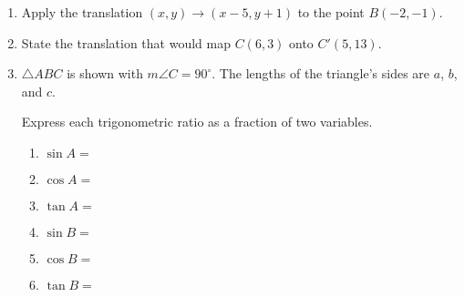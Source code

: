 \begin{enumerate}
\item Apply the translation $(x,y) \rightarrow (x-5,y+1)$ to the point $B(-2,-1)$. \vspace{1cm}

\item State the translation that would map $C(6,3)$ onto $C'(5,13)$.
  
\item $\triangle ABC$ is shown with $m\angle C=90^\circ$. The lengths of the triangle's sides are $a$, $b$, and $c$.
  \begin{center}
  \end{center}
  Express each trigonometric ratio as a fraction of two variables.
  \begin{multicols}{2}
    \begin{enumerate}
    \item $\sin A =$ \vspace{0.5cm}
    \item $\cos A =$ \vspace{0.5cm}
    \item $\tan A =$
    \item $\sin B =$ \vspace{0.5cm}
    \item $\cos B =$ \vspace{0.5cm}
    \item $\tan B =$
  \end{enumerate}
\end{multicols}


\end{enumerate}
